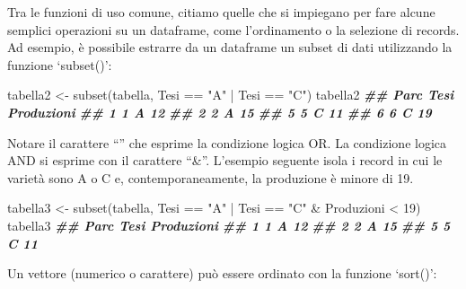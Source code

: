 \documentclass[
  12pt,
]{book}
\newenvironment{Shaded}{\begin{snugshade}}{\end{snugshade}}
\newcommand{\DecValTok}[1]{\textcolor[rgb]{0.00,0.00,0.81}{#1}}
\newcommand{\DocumentationTok}[1]{\textcolor[rgb]{0.56,0.35,0.01}{\textbf{\textit{#1}}}}
\newcommand{\FunctionTok}[1]{\textcolor[rgb]{0.00,0.00,0.00}{#1}}
\newcommand{\NormalTok}[1]{#1}
\newcommand{\OtherTok}[1]{\textcolor[rgb]{0.56,0.35,0.01}{#1}}
\newcommand{\SpecialCharTok}[1]{\textcolor[rgb]{0.00,0.00,0.00}{#1}}
\newcommand{\StringTok}[1]{\textcolor[rgb]{0.31,0.60,0.02}{#1}}
\begin{document}
Tra le funzioni di uso comune, citiamo quelle che si impiegano per fare alcune semplici operazioni su un dataframe, come l'ordinamento o la selezione di records. Ad esempio, è possibile estrarre da un dataframe un subset di dati utilizzando la funzione `subset()':

\begin{Shaded}
\begin{Highlighting}[]
\NormalTok{tabella2  }\OtherTok{\textless{}{-}}  \FunctionTok{subset}\NormalTok{(tabella, Tesi }\SpecialCharTok{==} \StringTok{"A"} \SpecialCharTok{|}\NormalTok{ Tesi }\SpecialCharTok{==} \StringTok{"C"}\NormalTok{)}
\NormalTok{tabella2}
\DocumentationTok{\#\#   Parc Tesi Produzioni}
\DocumentationTok{\#\# 1    1    A         12}
\DocumentationTok{\#\# 2    2    A         15}
\DocumentationTok{\#\# 5    5    C         11}
\DocumentationTok{\#\# 6    6    C         19}
\end{Highlighting}
\end{Shaded}

Notare il carattere ``\textbar{}'' che esprime la condizione logica OR. La condizione logica AND si esprime con il carattere ``\&''. L'esempio seguente isola i record in cui le varietà sono A o C e, contemporaneamente, la produzione è minore di 19.

\begin{Shaded}
\begin{Highlighting}[]
\NormalTok{tabella3  }\OtherTok{\textless{}{-}}  \FunctionTok{subset}\NormalTok{(tabella, Tesi }\SpecialCharTok{==} \StringTok{"A"} \SpecialCharTok{|}\NormalTok{ Tesi }\SpecialCharTok{==} \StringTok{"C"} \SpecialCharTok{\&} 
\NormalTok{                       Produzioni }\SpecialCharTok{\textless{}} \DecValTok{19}\NormalTok{)}
\NormalTok{tabella3}
\DocumentationTok{\#\#   Parc Tesi Produzioni}
\DocumentationTok{\#\# 1    1    A         12}
\DocumentationTok{\#\# 2    2    A         15}
\DocumentationTok{\#\# 5    5    C         11}
\end{Highlighting}
\end{Shaded}

Un vettore (numerico o carattere) può essere ordinato con la funzione `sort()':
\end{document}
